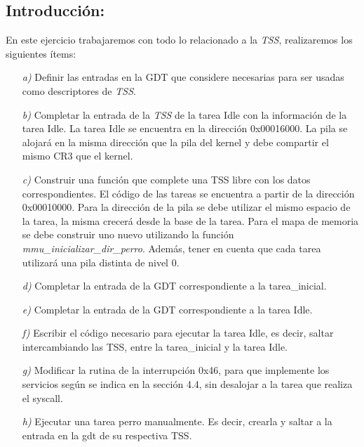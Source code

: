 \subsection{Introducción:}

En este ejercicio trabajaremos con todo lo relacionado a la \textit{TSS}, realizaremos los siguientes ítems:

\begin{itemize}



\item [\textit{a)}]  Definir las entradas en la GDT que considere necesarias para ser usadas como descriptores de \textit{TSS}.

\item [\textit{b)}] Completar la entrada de la \textit{TSS} de la tarea Idle con la información de la tarea Idle. La tarea Idle se encuentra en la dirección 0x00016000. La pila se alojará en la misma dirección que la pila del kernel y debe compartir el mismo CR3 que el kernel.

\item [\textit{c)}]  Construir una función que complete una TSS libre con los datos correspondientes. El código de las tareas se encuentra a partir de la dirección 0x00010000. Para la dirección de la pila se debe utilizar el mismo espacio de la tarea, la misma crecerá desde la base de la tarea. Para el mapa de memoria se debe construir uno nuevo utilizando la función \textit{mmu\_inicializar\_dir\_perro}. Además, tener en cuenta que cada tarea utilizará una pila distinta de nivel 0. 

\item [\textit{d)}] Completar la entrada de la GDT correspondiente a la tarea\_inicial.

\item [\textit{e)}]  Completar la entrada de la GDT correspondiente a la tarea Idle.

\item [\textit{f)}]  Escribir el código necesario para ejecutar la tarea Idle, es decir, saltar intercambiando las TSS, entre la tarea\_inicial y la tarea Idle.

\item [\textit{g)}] Modificar la rutina de la interrupción 0x46, para que implemente los servicios según se indica en la sección 4.4, sin desalojar a la tarea que realiza el syscall.

\item [\textit{h)}]  Ejecutar una tarea perro manualmente. Es decir, crearla y saltar a la entrada en la gdt de su respectiva TSS.

\end{itemize}